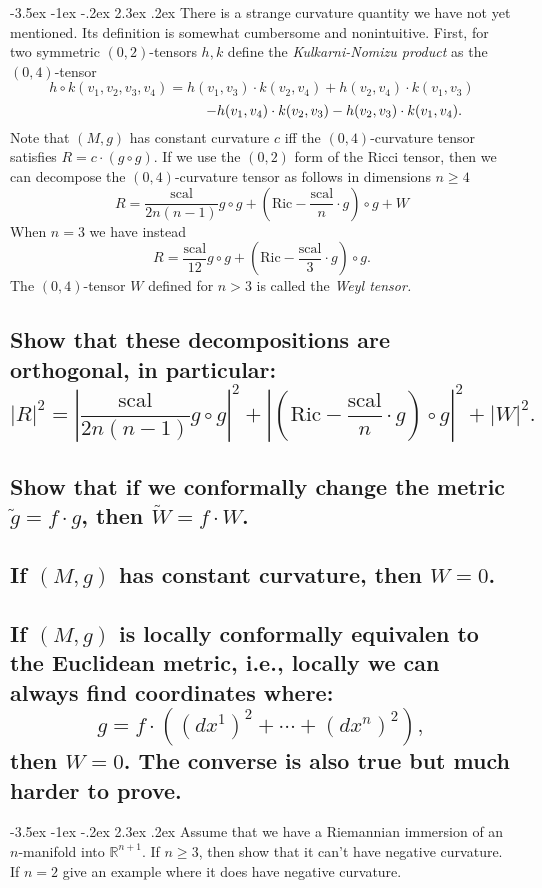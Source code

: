 \documentclass[10pt]{article}
\makeatletter
\renewcommand\section{\@startsection{section}{1}{\z@}%
                                  {-3.5ex \@plus -1ex \@minus -.2ex}%
                                  {2.3ex \@plus.2ex}%
                                  {\normalfont\large\bfseries}}
\newcommand{\R}{{\ensuremath{\mathbb{R}}} }
\newcommand{\ric}{\mbox{Ric}}
\newcommand{\scal}{\mbox{scal}}
\makeatother
\begin{document}
\section{There is a strange curvature quantity we have not yet mentioned. Its definition is somewhat cumbersome and nonintuitive. First, for two symmetric $(0,2)$-tensors $h,k$ define the \emph{Kulkarni-Nomizu product} as the $(0,4)$-tensor $$h \circ k(v_1, v_2, v_3, v_4) = h(v_1,v_3) \cdot k(v_2, v_4) + h(v_2, v_4) \cdot k(v_1, v_3)$$ $$\hspace{3.65cm}- h(v_1, v_4) \cdot k(v_2, v_3) -h(v_2, v_3) \cdot k(v_1, v_4).$$ Note that $(M, g)$ has constant curvature $c$ iff the $(0,4)$-curvature tensor satisfies $R = c \cdot (g \circ g)$. If we use the $(0,2)$ form of the Ricci tensor, then we can decompose the $(0,4)$-curvature tensor as follows in dimensions $n \geq 4$ $$R = \frac{\scal}{2n ( n-1)} g \circ g + \left( \ric - \frac{\scal}{n} \cdot g \right) \circ g + W $$ When $n=3$ we have instead $$ R = \frac{\scal}{12} g \circ g + \left( \ric - \frac{\scal}{3} \cdot g \right) \circ g.$$ The $(0,4)$-tensor $W$ defined for $n > 3$ is called the \emph{Weyl tensor.}}
\subsection{Show that these decompositions are orthogonal, in particular: $$|R|^2 = \left| \frac{\scal}{2n ( n-1)} g \circ g \right| ^2  + \left| \left( \ric - \frac{\scal}{n} \cdot g \right) \circ g \right|^2 + |W|^2.$$}
\subsection{Show that if we conformally change the metric $\tilde{g} = f \cdot g$, then $\tilde{W} = f \cdot W$.}
\subsection{If $(M,g)$ has constant curvature, then $W=0$.}
\subsection{If $(M,g)$ is locally conformally equivalen to the Euclidean metric, i.e., locally we can always find coordinates where: $$g = f \cdot \left( (dx^1)^2 + \cdots + (dx^n)^2 \right), $$ then $W=0$. The converse is also true but much harder to prove.}



\section{Assume that we have a Riemannian immersion of an $n$-manifold into $\R^{n+1}$. If $n \geq 3$, then show that it can't have negative curvature. If $n=2$ give an example where it does have negative curvature.}
\end{document}
